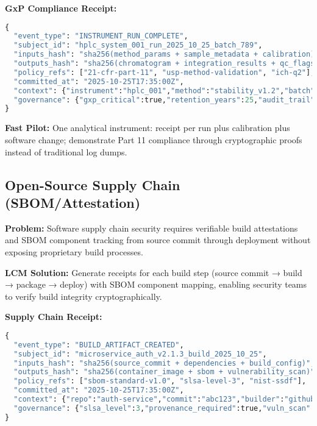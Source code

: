 \documentclass[12pt,a4paper]{article}
\begin{document}
\begin{technicalbox}
\textbf{GxP Compliance Receipt:}
\begin{lstlisting}[language=Python, caption=Medical Device Compliance Receipt]
{
  "event_type": "INSTRUMENT_RUN_COMPLETE",
  "subject_id": "hplc_system_001_run_2025_10_25_batch_789",
  "inputs_hash": "sha256(method_params + sample_metadata + calibration)",
  "outputs_hash": "sha256(chromatogram + integration_results + qc_flags)",
  "policy_refs": ["21-cfr-part-11", "usp-method-validation", "ich-q2"],
  "committed_at": "2025-10-25T17:35:00Z",
  "context": {"instrument":"hplc_001","method":"stability_v1.2","batch":"789"},
  "governance": {"gxp_critical":true,"retention_years":25,"audit_trail":true}
}
\end{lstlisting}
\end{technicalbox}

\textbf{Fast Pilot:} One analytical instrument: receipt per run plus calibration plus software change; demonstrate Part 11 compliance through cryptographic proofs instead of traditional log dumps.

\subsection{Open-Source Supply Chain (SBOM/Attestation)}

\textbf{Problem:} Software supply chain security requires verifiable build attestations and SBOM component tracking from source commit through deployment without exposing proprietary build processes.

\textbf{LCM Solution:} Generate receipts for each build step (source commit → build → package → deploy) with SBOM component mapping, enabling security teams to verify build integrity cryptographically.

\begin{technicalbox}
\textbf{Supply Chain Receipt:}
\begin{lstlisting}[language=Python, caption=Build Attestation Receipt]
{
  "event_type": "BUILD_ARTIFACT_CREATED",
  "subject_id": "microservice_auth_v2.1.3_build_2025_10_25",
  "inputs_hash": "sha256(source_commit + dependencies + build_config)",
  "outputs_hash": "sha256(container_image + sbom + vulnerability_scan)",
  "policy_refs": ["sbom-standard-v1.0", "slsa-level-3", "nist-ssdf"],
  "committed_at": "2025-10-25T17:35:00Z",
  "context": {"repo":"auth-service","commit":"abc123","builder":"github-actions"},
  "governance": {"slsa_level":3,"provenance_required":true,"vuln_scan":true}
}
\end{lstlisting}
\end{technicalbox}
\end{document}
